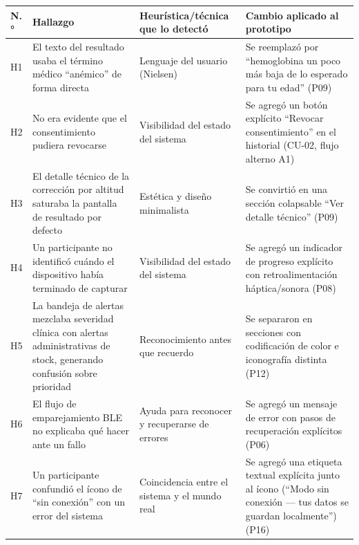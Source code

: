 \documentclass[11pt,a4paper]{article}
\begin{document}
{\small
\begin{longtable}[]{@{}
  >{\raggedright\arraybackslash}p{}
  >{\raggedright\arraybackslash}p{}
  >{\raggedright\arraybackslash}p{}
  >{\raggedright\arraybackslash}p{}@{}}
\toprule\noalign{}
\begin{minipage}[b]{\linewidth}\raggedright
N.°
\end{minipage} & \begin{minipage}[b]{\linewidth}\raggedright
Hallazgo
\end{minipage} & \begin{minipage}[b]{\linewidth}\raggedright
Heurística/técnica que lo detectó
\end{minipage} & \begin{minipage}[b]{\linewidth}\raggedright
Cambio aplicado al prototipo
\end{minipage} \\
\midrule\noalign{}
\endhead
\bottomrule\noalign{}
\endlastfoot
H1 & El texto del resultado usaba el término médico ``anémico'' de forma directa & Lenguaje del usuario (Nielsen) & Se reemplazó por ``hemoglobina un poco más baja de lo esperado para tu edad'' (P09) \\
H2 & No era evidente que el consentimiento pudiera revocarse & Visibilidad del estado del sistema & Se agregó un botón explícito ``Revocar consentimiento'' en el historial (CU-02, flujo alterno A1) \\
H3 & El detalle técnico de la corrección por altitud saturaba la pantalla de resultado por defecto & Estética y diseño minimalista & Se convirtió en una sección colapsable ``Ver detalle técnico'' (P09) \\
H4 & Un participante no identificó cuándo el dispositivo había terminado de capturar & Visibilidad del estado del sistema & Se agregó un indicador de progreso explícito con retroalimentación háptica/sonora (P08) \\
H5 & La bandeja de alertas mezclaba severidad clínica con alertas administrativas de stock, generando confusión sobre prioridad & Reconocimiento antes que recuerdo & Se separaron en secciones con codificación de color e iconografía distinta (P12) \\
H6 & El flujo de emparejamiento BLE no explicaba qué hacer ante un fallo & Ayuda para reconocer y recuperarse de errores & Se agregó un mensaje de error con pasos de recuperación explícitos (P06) \\
H7 & Un participante confundió el ícono de ``sin conexión'' con un error del sistema & Coincidencia entre el sistema y el mundo real & Se agregó una etiqueta textual explícita junto al ícono (``Modo sin conexión --- tus datos se guardan localmente'') (P16) \\
\end{longtable}
}
\end{document}
